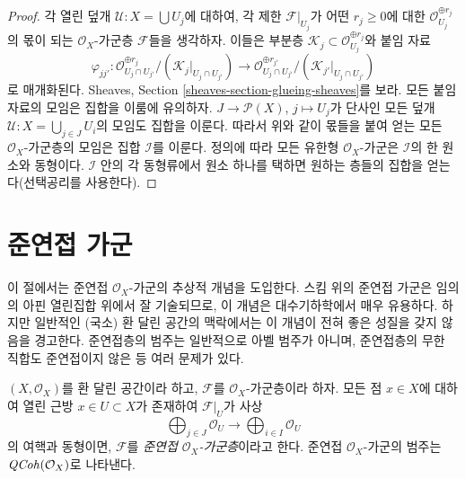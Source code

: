 \begin{proof}
각 열린 덮개 $\mathcal{U} : X = \bigcup U_j$에 대하여, 각 제한
$\mathcal{F}|_{U_j}$가 어떤 $r_j \geq 0$에 대한
$\mathcal{O}_{U_j}^{\oplus r_j}$의 몫이 되는 $\mathcal{O}_X$-가군층
$\mathcal{F}$들을 생각하자. 이들은 부분층
$\mathcal{K}_j \subset \mathcal{O}_{U_j}^{\oplus r_j}$와 붙임 자료
$$
\varphi_{jj'} :
\mathcal{O}_{U_j \cap U_{j'}}^{\oplus r_j}/
(\mathcal{K}_j|_{U_j \cap U_{j'}})
\longrightarrow
\mathcal{O}_{U_j \cap U_{j'}}^{\oplus r_{j'}}/
(\mathcal{K}_{j'}|_{U_j \cap U_{j'}})
$$
로 매개화된다. Sheaves, Section \ref{sheaves-section-glueing-sheaves}를 보라.
모든 붙임 자료의 모임은 집합을 이룸에 유의하자.
$J \to \mathcal{P}(X)$, $j \mapsto U_j$가 단사인 모든 덮개
$\mathcal{U} : X = \bigcup_{j \in J} U_i$의 모임도 집합을 이룬다.
따라서 위와 같이 몫들을 붙여 얻는 모든 $\mathcal{O}_X$-가군층의 모임은
집합 $\mathcal{I}$를 이룬다. 정의에 따라 모든 유한형
$\mathcal{O}_X$-가군은 $\mathcal{I}$의 한 원소와 동형이다.
$\mathcal{I}$ 안의 각 동형류에서 원소 하나를 택하면 원하는 층들의
집합을 얻는다(선택공리를 사용한다).
\end{proof}













\section{준연접 가군}
\label{section-quasi-coherent}

\noindent
이 절에서는 준연접 $\mathcal{O}_X$-가군의 추상적 개념을 도입한다.
스킴 위의 준연접 가군은 임의의 아핀 열린집합 위에서 잘 기술되므로,
이 개념은 대수기하학에서 매우 유용하다.
하지만 일반적인 (국소) 환 달린 공간의 맥락에서는 이 개념이
전혀 좋은 성질을 갖지 않음을 경고한다. 준연접층의 범주는 일반적으로
아벨 범주가 아니며, 준연접층의 무한 직합도 준연접이지 않은 등 여러 문제가 있다.

\begin{definition}
\label{definition-quasi-coherent}
$(X, \mathcal{O}_X)$를 환 달린 공간이라 하고,
$\mathcal{F}$를 $\mathcal{O}_X$-가군층이라 하자.
모든 점 $x \in X$에 대하여 열린 근방 $x\in U \subset X$가 존재하여
$\mathcal{F}|_U$가 사상
$$
\bigoplus\nolimits_{j \in J}
\mathcal{O}_U
\longrightarrow
\bigoplus\nolimits_{i \in I}
\mathcal{O}_U
$$
의 여핵과 동형이면, $\mathcal{F}$를 {\it 준연접
$\mathcal{O}_X$-가군층}이라고 한다.
준연접 $\mathcal{O}_X$-가군의 범주는 $\mathit{QCoh}(\mathcal{O}_X)$로 나타낸다.
\end{definition}

